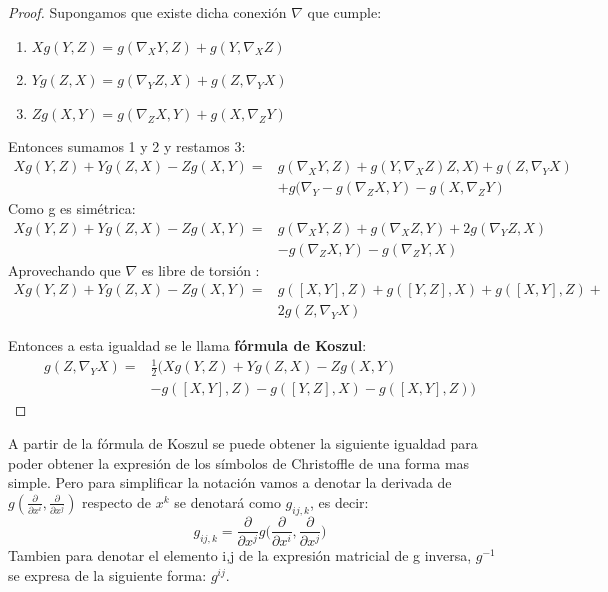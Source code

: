 \documentclass[pdftex,11pt,a4paper]{book}
\begin{document}
\begin{proof}
Supongamos que existe dicha conexión $\nabla$ que cumple:
\begin{enumerate}
    \item$
Xg( Y, Z)=g(\nabla_{X} Y, Z) +g(Y, \nabla_{X} Z) $
\item $
Yg( Z, X)=g(\nabla_{Y} Z, X)+g( Z, \nabla_{Y} X) $
\item $
Zg(X, Y)=g(\nabla_{Z} X, Y)+g( X, \nabla_{Z} Y)$

\end{enumerate}
Entonces sumamos 1 y 2 y restamos 3:
\begin{equation}
\begin{aligned}
   Xg( Y, Z) + Yg( Z, X) - Zg(X, Y) =& g(\nabla_{X} Y, Z) +g(Y, \nabla_{X} Z)   Z, X)+g( Z, \nabla_{Y} X)\\
       &  + g(\nabla_{Y}- g(\nabla_{Z} X, Y) - g( X, \nabla_{Z} Y) 
\end{aligned}
\end{equation}
Como g es simétrica: 
\begin{equation}
\begin{aligned}
    Xg( Y, Z) + Yg( Z, X) - Zg(X, Y) = &g(\nabla_{X} Y, Z) + g( \nabla_{X} Z , Y)+ 2 g(\nabla_{Y} Z, X) \\
    & - g(\nabla_{Z} X, Y) - g(\nabla_{Z} Y,X)   
\end{aligned}
\end{equation}
Aprovechando que $\nabla$ es libre de torsión :
\begin{equation}
\begin{aligned}
    Xg( Y, Z) + Yg( Z, X) - Zg(X, Y) =&  g([X,Y],Z )+ g([Y,Z],X)+ g([X,Y],Z)+\\ 
    &2g(Z,\nabla_Y X)
\end{aligned}
\end{equation}

Entonces a esta igualdad se le llama \textbf{fórmula de Koszul}: 
\begin{equation}\label{eq:koszul}
\begin{aligned}
       g(Z,\nabla_Y X) =& \frac{1}{2}\bigg(  Xg( Y, Z) + Yg( Z, X) - Zg(X, Y) \\
    & -  g([X,Y],Z )- g([Y,Z],X)- g([X,Y],Z)\bigg)
\end{aligned}
\end{equation}
\end{proof}
A partir de la fórmula de Koszul se puede obtener la siguiente igualdad para poder obtener la expresión de los símbolos de Christoffle de una forma mas simple. Pero para simplificar la notación vamos a denotar la derivada de $g(\frac{\partial}{\partial x^i}, \frac{\partial}{\partial x^j})$ respecto de $x^k$ se denotará como $g_{ij,k}$, es decir: 
\begin{equation}
    g_{ij,k}= \frac{\partial}{\partial x^j}g\bigg( \frac{\partial}{\partial x^i}, \frac{\partial}{\partial x^j}\bigg)
\end{equation}
Tambien para denotar el elemento i,j de la expresión matricial de g inversa, $g^{-1}$ se expresa de la siguiente forma: $g^{ij}$.
\end{document}
